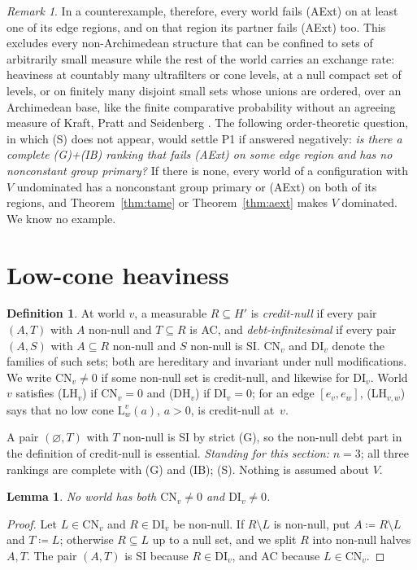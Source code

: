 \documentclass[11pt]{article}
\newtheorem{lemma}[theorem]{Lemma}
\theoremstyle{definition}\newtheorem{definition}[theorem]{Definition}
\theoremstyle{remark}\newtheorem{remark}[theorem]{Remark}
\newcommand{\Lo}[3]{\mathrm L^{#1}_{#2}(#3)}
\newcommand{\CN}{\mathrm{CN}}
\newcommand{\DI}{\mathrm{DI}}
\begin{document}
\begin{remark}\label{rem:Q}
In a counterexample, therefore, every world fails (AExt) on at least one of
its edge regions, and on that region its partner fails (AExt) too. This
excludes every non-Archimedean structure that can be confined to sets of
arbitrarily small measure while the rest of the world carries an exchange
rate: heaviness at countably many ultrafilters or cone levels, at a null
compact set of levels, or on finitely many disjoint small sets whose
unions are ordered, over an Archimedean base, like the finite comparative
probability without an agreeing measure of Kraft, Pratt and Seidenberg
\cite{KPS}. The following order-theoretic question, in which
(S) does not appear, would settle P1 if answered negatively: \emph{is there a
complete (G)+(IB) ranking that fails (AExt) on some edge region and has no
nonconstant group primary?} If there is none, every world of a
configuration with $V$ undominated has a nonconstant group primary or (AExt)
on both of its regions, and Theorem~\ref{thm:tame} or
Theorem~\ref{thm:aext} makes $V$ dominated. We know no example.
\end{remark}

\section{Low-cone heaviness}\label{sec:LH}

\begin{definition}\label{def:CN}
At world $v$, a measurable $R\subseteq H'$ is \emph{credit-null} if every
pair $(A,T)$ with $A$ non-null and $T\subseteq R$ is AC, and
\emph{debt-infinitesimal} if every pair $(A,S)$ with $A\subseteq R$ non-null
and $S$ non-null is SI. $\CN_v$ and $\DI_v$ denote the families of such sets;
both are hereditary and invariant under null modifications. We write
$\CN_v\ne0$ if some non-null set is credit-null, and likewise for $\DI_v$.
World $v$ satisfies (LH$_v$) if $\CN_v=0$ and (DH$_v$) if $\DI_v=0$; for an
edge $[e_v,e_w]$, (LH$_{v,w}$) says that no low cone $\Lo vwa$, $a>0$, is
credit-null at~$v$.
\end{definition}

A pair $(\varnothing,T)$ with $T$ non-null is SI by strict (G), so the
non-null debt part in the definition of credit-null is essential.
\emph{Standing for this section:} $n=3$; all three rankings are complete
with (G) and (IB); (S). Nothing is assumed about $V$.

\begin{lemma}\label{lem:excl}
No world has both $\CN_v\ne0$ and $\DI_v\ne0$.
\end{lemma}
\begin{proof}
Let $L\in\CN_v$ and $R\in\DI_v$ be non-null. If $R\setminus L$ is non-null,
put $A\coloneqq R\setminus L$ and $T\coloneqq L$; otherwise $R\subseteq L$ up
to a null set, and we split $R$ into non-null halves $A,T$. The pair $(A,T)$
is SI because $R\in\DI_v$, and AC because $L\in\CN_v$.
\end{proof}
\end{document}
